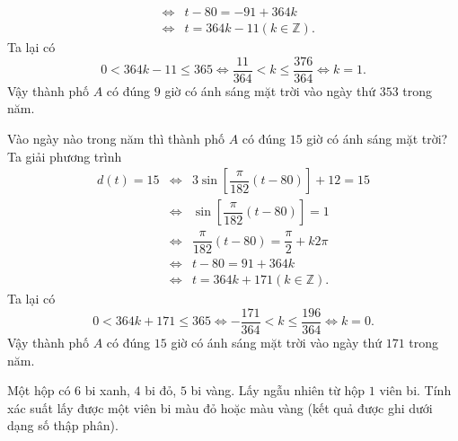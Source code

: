 \begin{bt}
{\begin{listEX}[1]
\begin{eqnarray*}
				&\Leftrightarrow& t-80 = -91+364k\\
				&\Leftrightarrow& t= 364k-11 (k\in \mathbb{Z}).	
			\end{eqnarray*}
			Ta lại có  \[0<364k-11 \le 365 \Leftrightarrow \dfrac{11}{364}<k \le \dfrac{376}{364} \Leftrightarrow k=1.\]
			Vậy thành phố $A$ có đúng $9$ giờ có ánh sáng mặt trời vào ngày thứ $353$ trong năm.
			\item Vào ngày nào trong năm thì thành phố $A$ có đúng $15$ giờ có ánh sáng mặt trời?
			Ta giải phương trình 
			\begin{eqnarray*}
				d(t)=15 &\Leftrightarrow& 3\sin\left[\dfrac{\pi}{182}(t-80)\right] +12=15 \\
				&\Leftrightarrow& \sin\left[\dfrac{\pi}{182}(t-80)\right]=1\\
				&\Leftrightarrow& \dfrac{\pi}{182}(t-80) =\dfrac{\pi}{2}+k2 \pi \\
				&\Leftrightarrow& t-80 = 91+364k\\
				&\Leftrightarrow& t= 364k+171 (k\in \mathbb{Z}).	
			\end{eqnarray*}
			Ta lại có  \[0<364k+171 \le 365 \Leftrightarrow -\dfrac{171}{364}<k \le \dfrac{196}{364} \Leftrightarrow k=0.\]
			Vậy thành phố $A$ có đúng $15$ giờ có ánh sáng mặt trời vào ngày thứ $171$ trong năm.
		\end{listEX}
	}
\end{bt}

\begin{ex}[Mức độ 2]%
	Một hộp có $6$ bi xanh, $4$ bi đỏ, $5$ bi vàng. Lấy ngẫu nhiên từ hộp $1$ viên bi. Tính xác suất lấy được một viên bi màu đỏ hoặc màu vàng (kết quả được ghi dưới dạng số thập phân).
\end{ex}

